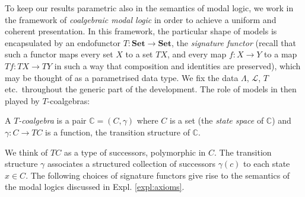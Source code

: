 \documentclass[proceedings]{stacs}
\theoremstyle{definition}
\theoremstyle{plain}
\newcommand{\Cat}{\mathbf}
\newcommand{\Set}{\Cat{Set}}
\newcommand{\Lang}{\mathcal{L}}
\begin{document}
\noindent To keep our results parametric also in the semantics of
modal logic, we work in the framework of \emph{coalgebraic modal
  logic} in order to achieve a uniform and coherent presentation.  In
this framework, the particular shape of models is encapsulated by an
endofunctor $T: \Set \to \Set$, the \emph{signature functor} (recall
that such a functor maps every set $X$ to a set $TX$, and every map
$f:X\to Y$ to a map $Tf:TX\to TY$ in such a way that composition and
identities are preserved), which may be thought of as a parametrised
data type. We fix the data $\Lambda$, $\Lang$, $T$ etc.\ throughout
the generic part of the development. The role of models in then played
by $T$-coalgebras:
\begin{defi}
A \emph{$T$-coalgebra} is a pair $\mathbb{C} = (C, \gamma)$ where $C$ is a set
(the \emph{state space} of $\mathbb{C}$)
and $\gamma: C \to  T C$ is a
function, the transition structure of $\mathbb{C}$.
\end{defi}
\noindent We think of $TC$ as a type of successors,
polymorphic in $C$. The
transition structure $\gamma$
associates a structured collection of successors 
$\gamma(c)$ to each state $x\in C$.
\noindent The following choices of signature functors give rise to the
semantics of the modal logics discussed in Expl.
\ref{expl:axioms}.
\end{document}
